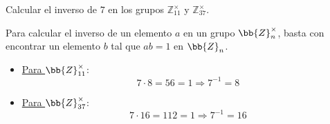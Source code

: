 \begin{ejercicio}\label{ej:2.3}
    Calcular el inverso de $7$ en los grupos $\mathbb{Z}^{\times}_{11}$ y $\mathbb{Z}^{\times}_{37}$.

    Para calcular el inverso de un elemento $a$ en un grupo $\bb{Z}^{\times}_n$, basta con encontrar un elemento $b$ tal que $ab=1$ en $\bb{Z}_n$.
    \begin{itemize}
        \item \ul{Para $\bb{Z}^{\times}_{11}$}:
        \begin{equation*}
            7\cdot 8 = 56=1\Longrightarrow 7^{-1} = 8
        \end{equation*}

        \item \ul{Para $\bb{Z}^{\times}_{37}$}:
        \begin{equation*}
            7\cdot 16 = 112 = 1\Longrightarrow 7^{-1} = 16
        \end{equation*}
    \end{itemize}
\end{ejercicio}

